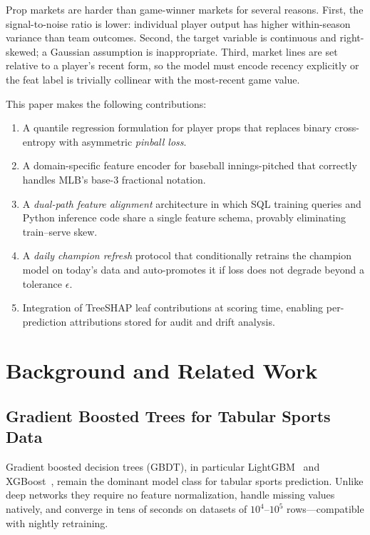 \documentclass[conference]{IEEEtran}
\begin{document}
Prop markets are harder than game-winner markets for several reasons.
First, the signal-to-noise ratio is lower: individual player output
has higher within-season variance than team outcomes.
Second, the target variable is continuous and right-skewed; a Gaussian
assumption is inappropriate.
Third, market lines are set relative to a player's recent form, so the
model must encode recency explicitly or the feat label is trivially
collinear with the most-recent game value.

This paper makes the following contributions:
\begin{enumerate}
  \item A quantile regression formulation for player props that replaces
        binary cross-entropy with asymmetric \emph{pinball loss}.
  \item A domain-specific feature encoder for baseball innings-pitched that
        correctly handles MLB's base-3 fractional notation.
  \item A \emph{dual-path feature alignment} architecture in which SQL
        training queries and Python inference code share a single feature
        schema, provably eliminating train--serve skew.
  \item A \emph{daily champion refresh} protocol that conditionally
        retrains the champion model on today's data and auto-promotes it
        if loss does not degrade beyond a tolerance $\epsilon$.
  \item Integration of TreeSHAP leaf contributions at scoring time,
        enabling per-prediction attributions stored for audit and drift analysis.
\end{enumerate}

\section{Background and Related Work}
\label{sec:background}

\subsection{Gradient Boosted Trees for Tabular Sports Data}

Gradient boosted decision trees (GBDT), in particular LightGBM~\cite{ke2017}
and XGBoost~\cite{chen2016}, remain the dominant model class for tabular
sports prediction. Unlike deep networks they require no feature normalization,
handle missing values natively, and converge in tens of seconds on datasets
of $10^4$--$10^5$ rows---compatible with nightly retraining.
\end{document}
